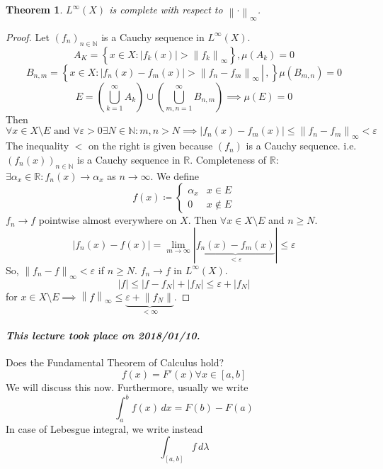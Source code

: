 \documentclass{article}
\newtheorem{theorem}{Theorem}  \numberwithin{theorem}{section}
\newcommand{\set}[1]{\left\{#1\right\}}
\newcommand{\setdef}[2]{\left\{\left.#1\,\right|\,#2\right\}}
\newcommand{\norm}[1]{\left\|#1\right\|}
\newcommand{\card}[1]{\left|#1\right|}
\newcommand{\dateref}[1]{\paragraph{\textit{This lecture took place on #1.}}}
\begin{document}
\begin{theorem}
  $L^\infty(X)$ is complete with respect to $\norm{\cdot}_{\infty}$.
\end{theorem}
\begin{proof}
  Let $(f_n)_{n\in\mathbb N}$ is a Cauchy sequence in $L^\infty(X)$.
  \[ A_K = \set{x \in X: \card{f_k(x)} > \norm{f_k}_{\infty}}, \mu(A_k) = 0 \]
  \[ B_{n,m} = \setdef{x \in X: \card{f_n(x) - f_m(x)} > \norm{f_n - f_m}_{\infty}}, \mu(B_{m,n}) = 0 \]
  \[ E = \left(\bigcup_{k=1}^\infty A_k\right) \cup \left(\bigcup_{m,n=1}^\infty B_{n,m}\right) \implies \mu(E) = 0 \]
  Then
  \[ \forall x \in X \setminus E \text{ and } \forall \varepsilon > 0 \exists N \in \mathbb N: m,n > N \implies \card{f_n(x) - f_m(x)} \leq \norm{f_n - f_m}_{\infty} < \varepsilon \]
  The inequality $<$ on the right is given because $(f_n)$ is a Cauchy sequence.
  i.e. $(f_n(x))_{n\in\mathbb N}$ is a Cauchy sequence in $\mathbb R$.
  Completeness of $\mathbb R$: $\exists \alpha_x \in \mathbb R: f_n(x) \to \alpha_x$ as $n \to \infty$.
  We define
  \[ f(x) \coloneqq \begin{cases} \alpha_x & x \in E \\ 0 & x \not\in E \end{cases} \]
  $f_n \to f$ pointwise almost everywhere on $X$. Then $\forall x \in X \setminus E$ and $n \geq N$.
  \[ \card{f_n(x) - f(x)} = \lim_{m\to\infty} \card{\underbrace{f_n(x) - f_m(x)}_{< \varepsilon}} \leq \varepsilon \]
  So, $\norm{f_n - f}_{\infty} < \varepsilon$ if $n \geq N$.
  $f_n \to f$ in $L^\infty(X)$.
  \[ \card{f} \leq \card{f - f_N} + \card{f_N} \leq \varepsilon + \card{f_N} \]
  for $x \in X \setminus E \implies \norm{f}_{\infty} \leq \underbrace{\varepsilon + \norm{f_N}}_{<\infty}$.
\end{proof}

\dateref{2018/01/10}

Does the Fundamental Theorem of Calculus hold?
\[ f(x) = F'(x) \forall x \in [a,b] \]
We will discuss this now. Furthermore, usually we write
\[ \int_a^b f(x) \, dx = F(b) - F(a) \]
In case of Lebesgue integral, we write instead
\[ \int_{[a,b]} f \, d\lambda \]
\end{document}
